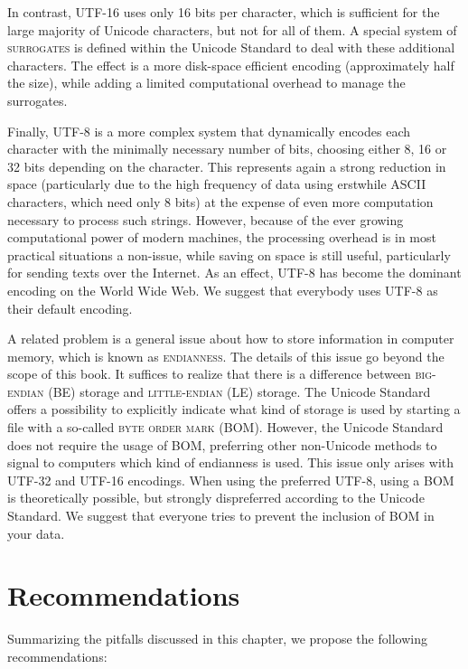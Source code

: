In contrast, \textsc{UTF-16} uses only 16 bits per character, which is
sufficient for the large majority of Unicode characters, but not for all of
them. A special system of \textsc{surrogates} is defined within the Unicode Standard to
deal with these additional characters. The effect is a more disk-space efficient
encoding (approximately half the size), while adding a limited computational
overhead to manage the surrogates. 

Finally, \textsc{UTF-8} is a more complex system that dynamically encodes each
character with the minimally necessary number of bits, choosing either 8, 16 or
32 bits depending on the character. This represents again a strong reduction in
space (particularly due to the high frequency of data using erstwhile ASCII
characters, which need only 8 bits) at the expense of even more computation
necessary to process such strings. However, because of the ever growing
computational power of modern machines, the processing overhead is in most
practical situations a non-issue, while saving on space is still useful,
particularly for sending texts over the Internet. As an effect, UTF-8 has become
the dominant encoding on the World Wide Web. We suggest that everybody uses
UTF-8 as their default encoding.

A related problem is a general issue about how to store information in computer
memory, which is known as \textsc{endianness}. The details of this issue go
beyond the scope of this book. It suffices to realize that there is a
difference between \textsc{big-endian} (BE) storage and \textsc{little-endian}
(LE) storage. The Unicode Standard offers a possibility to explicitly indicate
what kind of storage is used by starting a file with a so-called \textsc{byte order
mark} (BOM). However, the Unicode Standard does not require the usage of BOM,
preferring other non-Unicode methods to signal to computers which kind of
endianness is used. This issue only arises with UTF-32 and UTF-16 encodings.
When using the preferred UTF-8, using a BOM is theoretically possible, but
strongly dispreferred according to the Unicode Standard. We suggest that
everyone tries to prevent the inclusion of BOM in your data.

\section{Recommendations}
\label{recommendations}

Summarizing the pitfalls discussed in this chapter, we propose the following 
recommendations:

